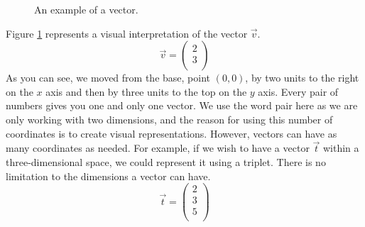 \documentclass[a4,12pt,twosided,openany]{memoir}
\begin{document}
\begin{figure}[h!]
\begin{center}
\end{center}
\caption{An example of a vector.}\label{fig:vectorExample}
\end{figure}
\par 
\indent
Figure \ref{fig:vectorExample} represents a visual interpretation of the vector $\overrightarrow{v}$.
\[\overrightarrow{v} = \begin{pmatrix}
 2\\
 3\\
\end{pmatrix}\]
As you can see, we moved from the base, point $(0,0)$, by two units to the right on the $x$ axis and then by three units to the top on the $y$ axis. Every pair of numbers gives you one and only one vector. We use the word pair here as we are only working with two dimensions, and the reason for using this number of coordinates is to create visual representations. However, vectors can have as many coordinates as needed. For example, if we wish to have a vector $\overrightarrow{t}$ within a three-dimensional space, we could represent it using a triplet. There is no limitation to the dimensions a vector can have.
\[\overrightarrow{t} = \begin{pmatrix}
 2\\
 3\\
 5\\
\end{pmatrix}\]
\end{document}
